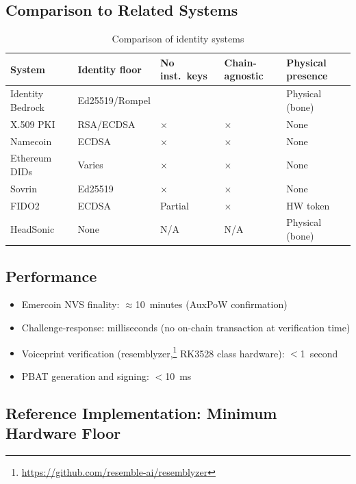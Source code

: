 \documentclass[12pt,a4paper]{article}
\begin{document}
\subsection{Comparison to Related Systems}

\begin{table}[H]
\caption{Comparison of identity systems}
\label{tab:comparison}
\small\renewcommand{\arraystretch}{1.3}
\begin{tabular}{P{2.8cm}P{2.5cm}P{1.8cm}P{2cm}P{2.5cm}}
\toprule
\textbf{System} & \textbf{Identity floor} & \textbf{No inst.\
  keys} & \textbf{Chain-agnostic} & \textbf{Physical presence}\\
\midrule
Identity Bedrock    & Ed25519/Rompel & \checkmark & \checkmark
  & Physical (bone)\\
X.509 PKI           & RSA/ECDSA      & $\times$   & $\times$
  & None\\
Namecoin            & ECDSA          & $\times$   & $\times$
  & None\\
Ethereum DIDs       & Varies         & $\times$   & $\times$
  & None\\
Sovrin              & Ed25519        & $\times$   & $\times$
  & None\\
FIDO2               & ECDSA          & Partial    & $\times$
  & HW token\\
HeadSonic~\cite{HeadSonic25} & None & N/A        & N/A
  & Physical (bone)\\
\bottomrule
\end{tabular}
\end{table}

\subsection{Performance}

\begin{itemize}
  \item Emercoin NVS finality: $\approx$10~minutes (AuxPoW
        confirmation)
  \item Challenge-response: milliseconds (no on-chain transaction at
        verification time)
  \item Voiceprint verification
        (resemblyzer,\footnote{\url{https://github.com/resemble-ai/resemblyzer}}
        RK3528 class hardware): $<$1~second
  \item PBAT generation and signing: $<$10~ms
\end{itemize}

\subsection{Reference Implementation: Minimum Hardware Floor}
\label{sec:refimpl}
\end{document}
